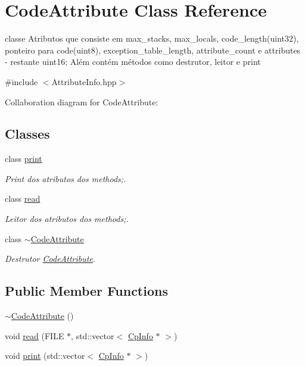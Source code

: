 \hypertarget{class_code_attribute}{}\section{Code\+Attribute Class Reference}
\label{class_code_attribute}


classe Atributos que consiste em max\+\_\+stacks, max\+\_\+locals, code\+\_\+length(uint32), ponteiro para code(uint8), exception\+\_\+table\+\_\+length, attribute\+\_\+count e attributes -\/ restante uint16; Além contém métodos como destrutor, leitor e print  




{\ttfamily \#include $<$Attribute\+Info.\+hpp$>$}



Collaboration diagram for Code\+Attribute\+:
\subsection*{Classes}
\begin{DoxyCompactItemize}
\item 
class \hyperlink{class_code_attribute_1_1print}{print}
\begin{DoxyCompactList}\small\item\em Print dos atributos dos methods;. \end{DoxyCompactList}\item 
class \hyperlink{class_code_attribute_1_1read}{read}
\begin{DoxyCompactList}\small\item\em Leitor dos atributos dos methods;. \end{DoxyCompactList}\item 
class \hyperlink{class_code_attribute_1_1~_code_attribute}{$\sim$\+Code\+Attribute}
\begin{DoxyCompactList}\small\item\em Destrutor \hyperlink{class_code_attribute}{Code\+Attribute}. \end{DoxyCompactList}\end{DoxyCompactItemize}
\subsection*{Public Member Functions}
\begin{DoxyCompactItemize}
\item 
\hyperlink{class_code_attribute_a4053ae31518d02d7b374284b05217a7b}{$\sim$\+Code\+Attribute} ()
\item 
void \hyperlink{class_code_attribute_ae5c7888c59b2a2990798c597c014a2ac}{read} (F\+I\+LE $\ast$, std\+::vector$<$ \hyperlink{class_cp_info}{Cp\+Info} $\ast$ $>$)
\item 
void \hyperlink{class_code_attribute_a380eb04a01b0a0db351cf74443067ba4}{print} (std\+::vector$<$ \hyperlink{class_cp_info}{Cp\+Info} $\ast$ $>$)
\end{DoxyCompactItemize}
